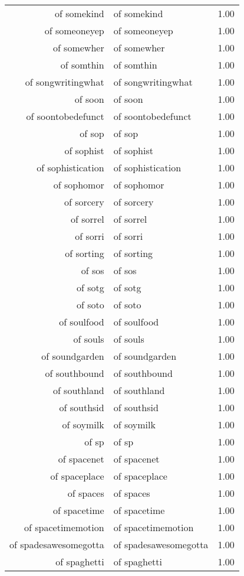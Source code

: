 \begin{table}[ht]
\begin{tabular}{rlr}
  of somekind & of somekind & 1.00 \\ 
  of someoneyep & of someoneyep & 1.00 \\ 
  of somewher & of somewher & 1.00 \\ 
  of somthin & of somthin & 1.00 \\ 
  of songwritingwhat & of songwritingwhat & 1.00 \\ 
  of soon & of soon & 1.00 \\ 
  of soontobedefunct & of soontobedefunct & 1.00 \\ 
  of sop & of sop & 1.00 \\ 
  of sophist & of sophist & 1.00 \\ 
  of sophistication & of sophistication & 1.00 \\ 
  of sophomor & of sophomor & 1.00 \\ 
  of sorcery & of sorcery & 1.00 \\ 
  of sorrel & of sorrel & 1.00 \\ 
  of sorri & of sorri & 1.00 \\ 
  of sorting & of sorting & 1.00 \\ 
  of sos & of sos & 1.00 \\ 
  of sotg & of sotg & 1.00 \\ 
  of soto & of soto & 1.00 \\ 
  of soulfood & of soulfood & 1.00 \\ 
  of souls & of souls & 1.00 \\ 
  of soundgarden & of soundgarden & 1.00 \\ 
  of southbound & of southbound & 1.00 \\ 
  of southland & of southland & 1.00 \\ 
  of southsid & of southsid & 1.00 \\ 
  of soymilk & of soymilk & 1.00 \\ 
  of sp & of sp & 1.00 \\ 
  of spacenet & of spacenet & 1.00 \\ 
  of spaceplace & of spaceplace & 1.00 \\ 
  of spaces & of spaces & 1.00 \\ 
  of spacetime & of spacetime & 1.00 \\ 
  of spacetimemotion & of spacetimemotion & 1.00 \\ 
  of spadesawesomegotta & of spadesawesomegotta & 1.00 \\ 
  of spaghetti & of spaghetti & 1.00 \\ 

\end{tabular}
\end{table}
